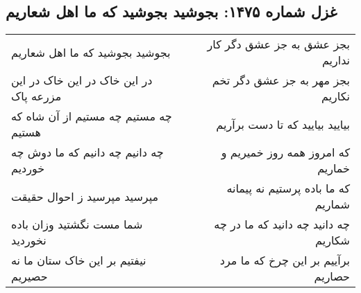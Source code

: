 \begin{center}
\section*{غزل شماره ۱۴۷۵: بجوشید بجوشید که ما اهل شعاریم}
\label{sec:1475}
\begin{longtable}{l p{0.5cm} r}
بجوشید بجوشید که ما اهل شعاریم
&&
بجز عشق به جز عشق دگر کار نداریم
\\
در این خاک در این خاک در این مزرعه پاک
&&
بجز مهر به جز عشق دگر تخم نکاریم
\\
چه مستیم چه مستیم از آن شاه که هستیم
&&
بیایید بیایید که تا دست برآریم
\\
چه دانیم چه دانیم که ما دوش چه خوردیم
&&
که امروز همه روز خمیریم و خماریم
\\
مپرسید مپرسید ز احوال حقیقت
&&
که ما باده پرستیم نه پیمانه شماریم
\\
شما مست نگشتید وزان باده نخوردید
&&
چه دانید چه دانید که ما در چه شکاریم
\\
نیفتیم بر این خاک ستان ما نه حصیریم
&&
برآییم بر این چرخ که ما مرد حصاریم
\\
\end{longtable}
\end{center}
